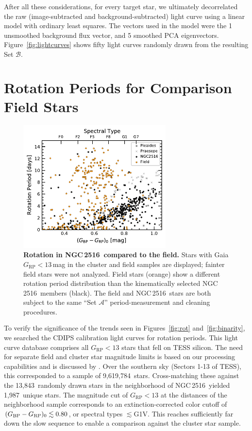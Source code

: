 \documentclass[12pt,twocolumn,tighten]{aastex63}
\newcommand{\cn}{NGC\,2516} %
\newcommand{\nnbhd}{13{,}843} %
\newcommand{\ncalibration}{9{,}619{,}784} %
\newcommand{\nnbhdcalibstar}{1{,}987} %
\newcommand{\bpmrpo}{(G_{\rm BP}-G_{\rm RP})_0}
\begin{document}
After all these considerations, for every target star, we
ultimately decorrelated the raw (image-subtracted and
background-subtracted) light curve using a linear model with ordinary
least squares.  The vectors used in the model were the 1
unsmoothed background flux vector, and 5 smoothed PCA eigenvectors.
Figure~\ref{fig:lightcurves} shows fifty light curves
randomly drawn from the resulting Set $\mathcal{B}$.




\section{Rotation Periods for Comparison Field Stars}
\label{app:compstar}

\begin{figure}[t]
	\begin{center}
		\leavevmode
    \includegraphics[width=0.69\textwidth]{f9.pdf}
	\end{center}
	\vspace{-0.7cm}
	\caption{ {\bf Rotation in \cn\ compared to the field.}
  Stars with Gaia $G_\mathrm{RP}<13$\,mag in the cluster and field samples are
  displayed; fainter field stars were not analyzed.  Field
  stars (orange) show a different rotation period distribution than
  the kinematically selected \cn\ members (black).  The field and \cn\
  stars are both subject to the same ``Set $\mathcal{A}$''
  period-measurement and cleaning procedures.
  \label{fig:compstar}
	}
\end{figure}

To verify the significance of the trends seen in Figures~\ref{fig:rot}
and~\ref{fig:binarity}, we searched the CDIPS calibration light curves
for rotation periods.  This light curve database comprises all $G_\mathrm{RP}<13$
stars that fell on TESS silicon. The need for separate field and
cluster star magnitude limits is based on our processing capabilities and is discussed
by \citet{bouma_cdipsI_2019}.  Over the southern sky (Sectors 1-13 of
TESS), this corresponded to a sample of \ncalibration\ stars.
Cross-matching these against the \nnbhd\ randomly drawn stars in the
neighborhood of \cn\ yielded \nnbhdcalibstar\ unique stars.  The
magnitude cut of $G_\mathrm{RP}<13$ at the distances of the neighborhood sample
corresponds to an extinction-corrected color cutoff of $\bpmrpo
\lesssim 0.80$, or spectral types $\lesssim$G1V.  This reaches
sufficiently far down the slow sequence to enable a comparison against
the cluster star sample.
\end{document}
